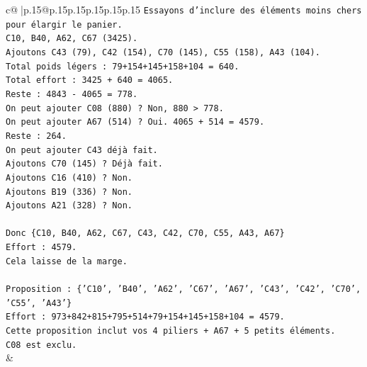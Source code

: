 \documentclass{article}
\begin{document}
{\begin{supertabular}{c@{$\;$}|p{.15\linewidth}@{}p{.15\linewidth}p{.15\linewidth}p{.15\linewidth}p{.15\linewidth}p{.15\linewidth}}
{{{\texttt{Essayons d'inclure des éléments moins chers pour élargir le panier.} \\
\texttt{C10, B40, A62, C67 (3425).} \\
\texttt{Ajoutons C43 (79), C42 (154), C70 (145), C55 (158), A43 (104).} \\
\texttt{Total poids légers : 79+154+145+158+104 = 640.} \\
\texttt{Total effort : 3425 + 640 = 4065.} \\
\texttt{Reste : 4843 {-} 4065 = 778.} \\
\texttt{On peut ajouter C08 (880) ? Non, 880 > 778.} \\
\texttt{On peut ajouter A67 (514) ? Oui. 4065 + 514 = 4579.} \\
\texttt{Reste : 264.} \\
\texttt{On peut ajouter C43 déjà fait.} \\
\texttt{Ajoutons C70 (145) ? Déjà fait.} \\
\texttt{Ajoutons C16 (410) ? Non.} \\
\texttt{Ajoutons B19 (336) ? Non.} \\
\texttt{Ajoutons A21 (328) ? Non.} \\
\\ 
\texttt{Donc \{C10, B40, A62, C67, C43, C42, C70, C55, A43, A67\}} \\
\texttt{Effort : 4579.} \\
\texttt{Cela laisse de la marge.} \\
\\ 
\texttt{Proposition : \{'C10', 'B40', 'A62', 'C67', 'A67', 'C43', 'C42', 'C70', 'C55', 'A43'\}} \\
\texttt{Effort : 973+842+815+795+514+79+154+145+158+104 = 4579.} \\
\texttt{Cette proposition inclut vos 4 piliers + A67 + 5 petits éléments.} \\
\texttt{C08 est exclu.} \\
            }
        }
    }
    & \\ \\


\end{supertabular}}
\end{document}
